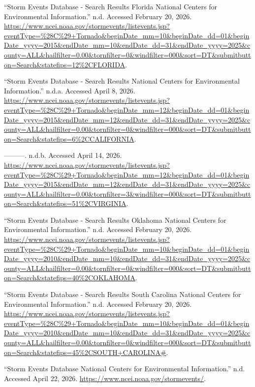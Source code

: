 \documentclass[
  letterpaper,
  DIV=11,
  numbers=noendperiod]{scrreprt}
\newlength{\cslhangindent}
\newenvironment{CSLReferences}[2] %
 {\begin{list}{}{%
  \setlength{\itemindent}{0pt}
  \setlength{\leftmargin}{0pt}
  \setlength{\parsep}{0pt}
  \ifodd #1
   \setlength{\leftmargin}{\cslhangindent}
   \setlength{\itemindent}{-1\cslhangindent}
  \fi
  \setlength{\itemsep}{#2\baselineskip}}}
 {\end{list}}
\begin{document}
\begin{CSLReferences}{1}{0}
{``Storm Events Database - Search Results Florida National Centers for
Environmental Information.''} n.d. Accessed February 20, 2026.
\url{https://www.ncei.noaa.gov/stormevents/listevents.jsp?eventType=\%28C\%29+Tornado&beginDate_mm=10&beginDate_dd=01&beginDate_yyyy=2015&endDate_mm=10&endDate_dd=31&endDate_yyyy=2025&county=ALL&hailfilter=0.00&tornfilter=0&windfilter=000&sort=DT&submitbutton=Search&statefips=12\%2CFLORIDA}.

{``Storm Events Database - Search Results {\textbar} National Centers
for Environmental Information.''} n.d.a. Accessed April 8, 2026.
\url{https://www.ncei.noaa.gov/stormevents/listevents.jsp?eventType=\%28C\%29+Tornado&beginDate_mm=12&beginDate_dd=01&beginDate_yyyy=2015&endDate_mm=12&endDate_dd=31&endDate_yyyy=2025&county=ALL&hailfilter=0.00&tornfilter=0&windfilter=000&sort=DT&submitbutton=Search&statefips=6\%2CCALIFORNIA}.

---------. n.d.b. Accessed April 14, 2026.
\url{https://www.ncei.noaa.gov/stormevents/listevents.jsp?eventType=\%28C\%29+Tornado&beginDate_mm=12&beginDate_dd=01&beginDate_yyyy=2015&endDate_mm=12&endDate_dd=31&endDate_yyyy=2025&county=ALL&hailfilter=0.00&tornfilter=3&windfilter=000&sort=DT&submitbutton=Search&statefips=51\%2CVIRGINIA}.

{``Storm Events Database - Search Results Oklahoma National Centers for
Environmental Information.''} n.d. Accessed February 20, 2026.
\url{https://www.ncei.noaa.gov/stormevents/listevents.jsp?eventType=\%28C\%29+Tornado&beginDate_mm=10&beginDate_dd=01&beginDate_yyyy=2010&endDate_mm=10&endDate_dd=31&endDate_yyyy=2025&county=ALL&hailfilter=0.00&tornfilter=0&windfilter=000&sort=DT&submitbutton=Search&statefips=40\%2COKLAHOMA}.

{``Storm Events Database - Search Results South Carolina National
Centers for Environmental Information.''} n.d. Accessed February 20,
2026.
\url{https://www.ncei.noaa.gov/stormevents/listevents.jsp?eventType=\%28C\%29+Tornado&beginDate_mm=10&beginDate_dd=01&beginDate_yyyy=2010&endDate_mm=10&endDate_dd=31&endDate_yyyy=2025&county=ALL&hailfilter=0.00&tornfilter=0&windfilter=000&sort=DT&submitbutton=Search&statefips=45\%2CSOUTH+CAROLINA\#}.

{``Storm Events Database {\textbar} National Centers for Environmental
Information.''} n.d. Accessed April 22, 2026.
\url{https://www.ncei.noaa.gov/stormevents/}.


\end{CSLReferences}
\end{document}
